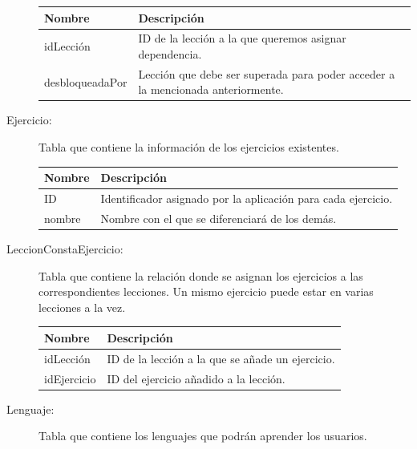 \begin{description}
\begin{tabularx}{14cm}{|l|X|}
\hline
\textbf{Nombre} & \textbf{Descripción}                                                              \\ \hline
idLección       & ID de la lección a la que queremos asignar dependencia.                                                          \\ \hline
desbloqueadaPor     & Lección que debe ser superada para poder acceder a la mencionada anteriormente.                                           \\ \hline
\end{tabularx}
\vspace{1em}

\item[Ejercicio:] Tabla que contiene la información de los ejercicios existentes.

\begin{tabularx}{14cm}{|l|X|}
\hline
\textbf{Nombre} & \textbf{Descripción}                                                              \\ \hline
ID       & Identificador asignado por la aplicación para cada ejercicio. \\ \hline
nombre     & Nombre con el que se diferenciará de los demás.                                           \\ \hline
\end{tabularx}
\vspace{1em}

\item[LeccionConstaEjercicio:] Tabla que contiene la relación donde se asignan los ejercicios a las correspondientes lecciones. Un mismo ejercicio puede estar en varias lecciones a la vez.

\begin{tabularx}{14cm}{|l|X|}
\hline
\textbf{Nombre} & \textbf{Descripción}                                                              \\ \hline
idLección       & ID de la lección a la que se añade un ejercicio. \\ \hline
idEjercicio     & ID del ejercicio añadido a la lección.                                           \\ \hline
\end{tabularx}
\vspace{1em}

\item[Lenguaje:] Tabla que contiene los lenguajes que podrán aprender los usuarios.


\end{description}

